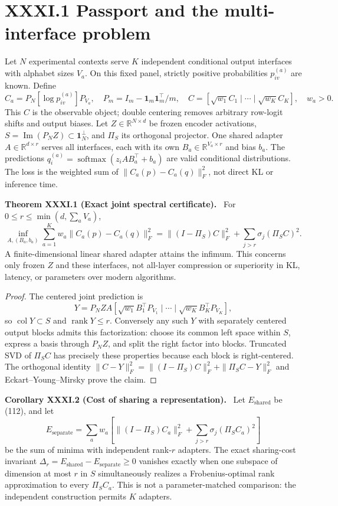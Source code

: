 \documentclass[11pt,a4paper,oneside]{book}
\newcommand{\R}{\mathbb R}\newcommand{\C}{\mathbb C}\newcommand{\Z}{\mathbb Z}\newcommand{\N}{\mathbb N}\newcommand{\Q}{\mathbb Q}
\newcommand{\one}{\mathbf 1}\newcommand{\ii}{\mathrm i}\newcommand{\dd}{\mathrm d}
\DeclareMathOperator{\rank}{rank}\DeclareMathOperator{\Tr}{Tr}
\newcommand{\statement}[3]{\par\medskip\noindent\textbf{#1 #2 (#3).}\ }
\begin{document}
\section*{XXXI.1 Passport and the multi-interface problem}
Let $N$ experimental contexts serve $K$ independent conditional output interfaces with alphabet sizes $V_a$. On this fixed panel, strictly positive probabilities $p^{(a)}_{iv}$ are known. Define
\[C_a=P_N[\log p^{(a)}_{iv}]P_{V_a},\quad P_m=I_m-\one_m\one_m^\top/m,\quad C=[\sqrt{w_1}C_1\mid\cdots\mid\sqrt{w_K}C_K],\quad w_a>0.\]
This $C$ is the observable object; double centering removes arbitrary row-logit shifts and output biases. Let $Z\in\R^{N\times d}$ be frozen encoder activations, $S=\operatorname{Im}(P_NZ)\subset\one_N^\perp$, and $\Pi_S$ its orthogonal projector. One shared adapter $A\in\R^{d\times r}$ serves all interfaces, each with its own $B_a\in\R^{V_a\times r}$ and bias $b_a$. The predictions $q_i^{(a)}=\operatorname{softmax}(z_iAB_a^\top+b_a)$ are valid conditional distributions. The loss is the weighted sum of $\|C_a(p)-C_a(q)\|_F^2$, not direct KL or inference time.
\statement{Theorem}{XXXI.1}{Exact joint spectral certificate} For $0\le r\le\min(d,\sum_aV_a)$,
\begin{equation}\inf_{A,(B_a,b_a)}\sum_{a=1}^K w_a\|C_a(p)-C_a(q)\|_F^2=\|(I-\Pi_S)C\|_F^2+\sum_{j>r}\sigma_j(\Pi_SC)^2.\tag{112}\end{equation}
A finite-dimensional linear shared adapter attains the infimum. This concerns only frozen $Z$ and these interfaces, not all-layer compression or superiority in KL, latency, or parameters over modern algorithms.
\begin{proof}The centered joint prediction is
\[Y=P_NZA[\sqrt{w_1}B_1^\top P_{V_1}\mid\cdots\mid\sqrt{w_K}B_K^\top P_{V_K}],\]
so $\operatorname{col}Y\subset S$ and $\rank Y\le r$. Conversely any such $Y$ with separately centered output blocks admits this factorization: choose its common left space within $S$, express a basis through $P_NZ$, and split the right factor into blocks. Truncated SVD of $\Pi_SC$ has precisely these properties because each block is right-centered. The orthogonal identity $\|C-Y\|_F^2=\|(I-\Pi_S)C\|_F^2+\|\Pi_SC-Y\|_F^2$ and Eckart--Young--Mirsky prove the claim.\end{proof}
\statement{Corollary}{XXXI.2}{Cost of sharing a representation} Let $E_{\mathrm{shared}}$ be (112), and let
\[E_{\mathrm{separate}}=\sum_a w_a\left[\|(I-\Pi_S)C_a\|_F^2+\sum_{j>r}\sigma_j(\Pi_SC_a)^2\right]\]
be the sum of minima with independent rank-$r$ adapters. The exact sharing-cost invariant $\Delta_r=E_{\mathrm{shared}}-E_{\mathrm{separate}}\ge0$ vanishes exactly when one subspace of dimension at most $r$ in $S$ simultaneously realizes a Frobenius-optimal rank approximation to every $\Pi_SC_a$. This is not a parameter-matched comparison: the independent construction permits $K$ adapters.
\end{document}
